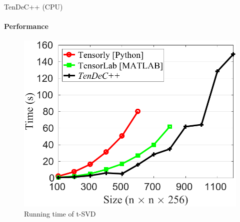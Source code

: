 \documentclass[t, 10pt, handout, aspectratio=169]{beamer}
\begin{document}
\begin{frame}{TenDeC++ (CPU)}
\framesubtitle{Performance}
\begin{figure}
	\centering  
	\includegraphics[width=0.5\linewidth]{figs/tendecpp_eval2.png}\\
	Running time of t-SVD
	\label{fig:tendecpp_eval3}
\end{figure}
\end{frame}
\end{document}
